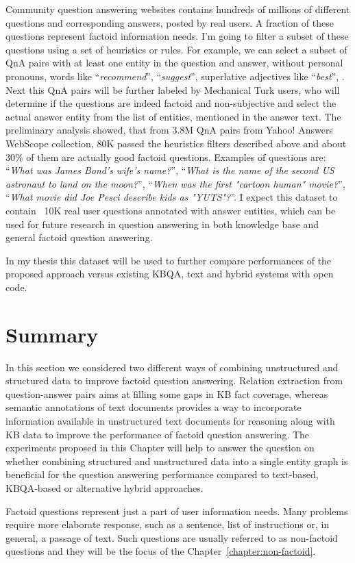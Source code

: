 
Community question answering websites contains hundreds of millions of different questions and corresponding answers, posted by real users.
A fraction of these questions represent factoid information needs.
I'm going to filter a subset of these questions using a set of heuristics or rules.
For example, we can select a subset of QnA pairs with at least one entity in the question and answer, without personal pronouns, words like ``\textit{recommend}'', ``\textit{suggest}'', superlative adjectives like ``\textit{best}'', \etc.
Next this QnA pairs will be further labeled by Mechanical Turk users, who will determine if the questions are indeed factoid and non-subjective and select the actual answer entity from the list of entities, mentioned in the answer text.
The preliminary analysis showed, that from 3.8M QnA pairs from Yahoo! Answers WebScope collection, 80K passed the heuristics filters described above and about 30\% of them are actually good factoid questions.
Examples of questions are: ``\textit{What was James Bond's wife's name?}'', ``\textit{What is the name of the second US astronaut to land on the moon?}'', ``\textit{When was the first "cartoon human" movie?}'', ``\textit{What movie did Joe Pesci describe kids as "YUTS"?}''.
I expect this dataset to contain ~10K real user questions annotated with answer entities, which can be used for future research in question answering in both knowledge base and general factoid question answering.

In my thesis this dataset will be used to further compare performances of the proposed approach versus existing KBQA, text and hybrid systems with open code.

\section{Summary}
\label{section:factoid:summary}

In this section we considered two different ways of combining unstructured and structured data to improve factoid question answering.
Relation extraction from question-answer pairs aims at filling some gaps in KB fact coverage, whereas semantic annotations of text documents provides a way to incorporate information available in unstructured text documents for reasoning along with KB data to improve the performance of factoid question answering.
The experiments proposed in this Chapter will help to answer the question on whether combining structured and unstructured data into a single entity graph is beneficial for the question answering performance compared to text-based, KBQA-based or alternative hybrid approaches.

Factoid questions represent just a part of user information needs. Many problems require more elaborate response, such as a sentence, list of instructions or, in general, a passage of text.
Such questions are usually referred to as non-factoid questions and they will be the focus of the Chapter~\ref{chapter:non-factoid}.